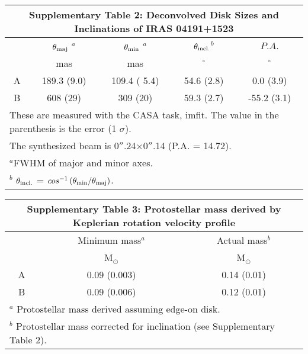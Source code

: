 \documentclass{nature}
\newcommand{\msun}{\mbox{M$_\odot$}}%
\begin{document}
\clearpage
\begin{tabular}{ccccc}
\multicolumn{5}{c}{\bf Supplementary Table 2: Deconvolved Disk Sizes and Inclinations of IRAS 04191+1523}
\label{tb:disk_inc}
\\\hline
{} &
{${\theta}_{\rm maj}$ $^a$} &
{${\theta}_{\rm min}$ $^a$} &
{${\theta}_{\rm incl.}$$^b$} &
{${P.A.}$} \\

{} &
{mas} &
{mas} &
{$^\circ$} &
{$^\circ$}
\\\hline\hline
A &  189.3 (9.0)  & 109.4 ( 5.4) & 54.6 (2.8) & 0.0 (3.9)  \\
B &  608 (29)     & 309 (20)     & 59.3 (2.7) & -55.2 (3.1)  \\
\hline
\multicolumn{5}{l}{\footnotesize These are measured with the CASA task, imfit. 
The value in the parenthesis is the error (1 $\sigma$). } \\
\multicolumn{5}{l}{\footnotesize  The synthesized beam is 0$''$.24$\times$0$''$.14 (P.A. = 14.72). } \\
\multicolumn{5}{l}{\footnotesize $^a$FWHM of major and minor axes. }\\
\multicolumn{5}{l}{\footnotesize $^b$  ${\theta}_{\rm incl.}$ = $cos^{-1}\left({\theta}_{\rm min}/{\theta}_{\rm maj}\right)$.}
\end{tabular}

\clearpage

\begin{tabular}{ccc}
\multicolumn{3}{c}{\bf Supplementary Table 3: Protostellar mass derived by Keplerian rotation velocity profile}
\label{tb:stellar_mass}
\\\hline
{} &
{Minimum mass$^a$} &
{Actual mass$^b$} \\
{} &
{\msun} &
{\msun} 
\\\hline\hline
A &  0.09 (0.003)    & 0.14 (0.01) \\
B &  0.09 (0.006)    & 0.12 (0.01) \\
\hline
\multicolumn{3}{l}{\footnotesize $^a$ Protostellar mass derived assuming edge-on disk.}\\
\multicolumn{3}{l}{\footnotesize $^b$ Protostellar mass corrected for inclination (see Supplementary Table 2).}
\end{tabular}
\end{document}

